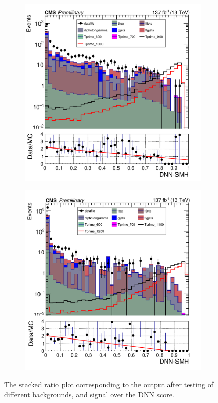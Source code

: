\begin{figure}[H]
\begin{subfigure}[b]{0.3\textwidth}
         \includegraphics[width=\textwidth]{figure_4/Stacked_plot_DNN_800-1000_with_diphoton_cuts.pdf}
     \end{subfigure}
     \hfill
     \begin{subfigure}[b]{0.3\textwidth}
         \centering
         \includegraphics[width=\textwidth]{figure_4/Stacked_plot_DNN_1100-1200_with_diphoton_cuts.pdf}
     \end{subfigure}
        \caption{The stacked ratio plot corresponding to the output after testing of different backgrounds, and signal over the DNN score.}
        \label{fig:stacked_plots_1}
\end{figure}

